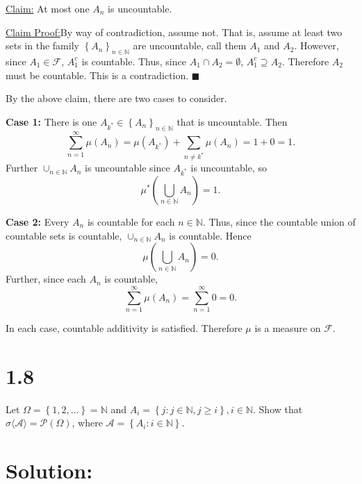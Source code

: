 \documentclass[12pt]{article}
\newenvironment{claimproof}[1]{\par\noindent\underline{Claim Proof:}\space#1}{\hfill $\blacksquare$}
\begin{document}
\underline{Claim:} At most one $A_{n}$ is uncountable.
\begin{claimproof}
By way of contradiction, assume not. That is, assume at least two sets in the family $\left\{ A_{n} \right\}_{n\in\mathbb{N}}$ are uncountable, call
them $A_{1}$ and $A_{2}$. However, since $A_{1} \in \mathcal{F}$, $A_{1}^{c}$ is countable. Thus, since $A_{1} \cap A_{2} = \emptyset$, $A_{1}^{c}
\supseteq A_{2}$. Therefore $A_{2}$ must be countable. This is a contradiction.
\end{claimproof}

By the above claim, there are two cases to consider.

{\bf Case 1:} There is one $A_{k^{*}} \in \left\{ A_{n} \right\}_{n\in\mathbb{N}}$ that is uncountable. Then
\[ \sum_{n=1}^{\infty}\mu(A_{n}) = \mu(A_{k^{*}}) + \sum_{n \neq k^{*}}\mu(A_{n}) = 1 + 0 = 1. \]
Further $\cup_{n\in\mathbb{N}}A_{n}$ is uncountable since $A_{k^{*}}$ is uncountable, so 
\[ \mu^{*}\left( \bigcup_{n\in\mathbb{N}}A_{n} \right) = 1. \]


{\bf Case 2:} Every $A_{n}$ is countable for each $n \in \mathbb{N}$. Thus, since the countable union of countable sets is countable,
$\cup_{n\in\mathbb{N}}A_{n}$ is countable. Hence 
\[ \mu\left( \bigcup_{n\in\mathbb{N}}A_{n} \right) = 0. \]
Further, since each $A_{n}$ is countable,
\[ \sum_{n=1}^{\infty}\mu(A_{n}) = \sum_{n=1}^{\infty}0 = 0. \]

In each case, countable additivity is satisfied. Therefore $\mu$ is a measure on $\mathcal{F}$.




\newpage
\section*{1.8}

Let $\Omega = \left\{ 1, 2, \dots \right\} = \mathbb{N}$ and $A_{i} = \left\{ j : j \in \mathbb{N}, j \geq i \right\}, i \in \mathbb{N}$. Show that
$\sigma \langle \mathcal{A} \rangle = \mathcal{P}(\Omega)$, where $\mathcal{A} = \left\{ A_{i} : i \in \mathbb{N} \right\}$.

\section*{Solution:}
\end{document}
